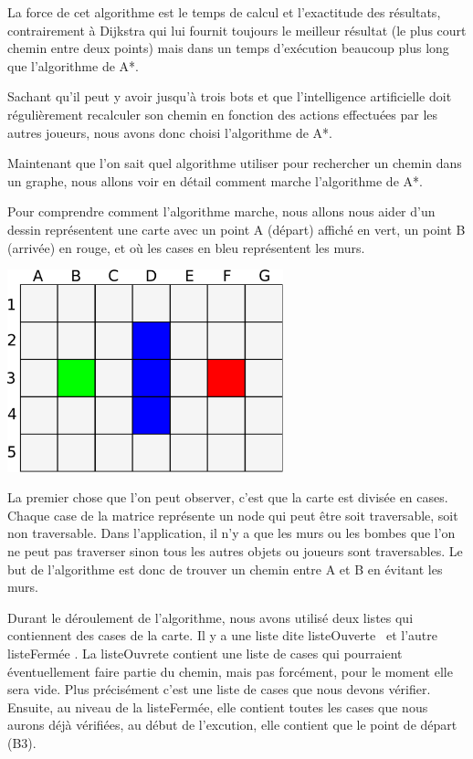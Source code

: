 			La force de cet algorithme est le temps de calcul et l'exactitude des résultats, contrairement à Dijkstra qui lui fournit toujours le meilleur résultat (le plus court chemin entre deux points) mais dans un temps d'exécution beaucoup plus long que l'algorithme de A*.
			
			Sachant qu'il peut y avoir jusqu'à trois \glspl{bot} et que l'intelligence artificielle doit régulièrement recalculer son chemin en fonction des actions effectuées par les autres joueurs, nous avons donc choisi l'algorithme de A*.
		
			Maintenant que l'on sait quel algorithme utiliser pour rechercher un chemin dans un graphe, nous allons voir en détail comment marche l'algorithme de A*.
		
			Pour comprendre comment l'algorithme marche, nous allons nous aider d'un
			dessin représentent une carte avec un point A (départ) affiché en vert, un
			point B (arrivée) en rouge, et où les cases en bleu représentent les murs.
		
			\begin{center}
				\includegraphics[width=8cm]{./Analyse/Img/Grille.eps}
			\end{center}
		
			La premier chose que l'on peut observer, c'est que la carte est divisée en
			cases. Chaque case de la matrice représente un node qui peut être soit
			traversable, soit non traversable. Dans l'application, il n'y a que les murs
			ou les bombes que l'on ne peut pas traverser sinon tous les autres objets
			ou joueurs sont traversables. Le but de l'algorithme est donc de
			trouver un chemin entre A et B en évitant les murs.
			
		
			Durant le déroulement de l'algorithme, nous avons utilisé deux listes qui contiennent des cases de la carte.
			Il y a une liste dite \og listeOuverte \fg \, et l'autre \og listeFermée \fg.
			La listeOuvrete contient une liste de cases qui pourraient éventuellement faire partie du chemin, mais pas forcément, pour le moment elle sera vide.
			Plus précisément c'est une liste de cases que nous devons vérifier.
			Ensuite, au niveau de la listeFermée, elle contient toutes les cases que nous
			aurons déjà vérifiées, au début de l'excution, elle contient que le point de départ (B3).
			
